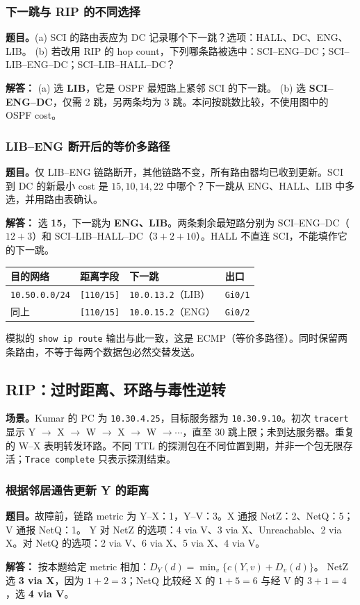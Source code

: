 \documentclass[11pt,a4paper,fontset=fandol]{ctexart}
\renewcommand{\exercisequestion}[2]{%
  \Needspace{5\baselineskip}%
  \subsubsection{#2}\label{exercise:#1}%
}
\renewenvironment{checkedsolution}
  {\par\nopagebreak[4]\textbf{解答：}\ignorespaces}
  {\par}
\begin{document}
\exercisequestion{SC2008-HW03-Q07}{下一跳与 RIP 的不同选择}
\textbf{题目。}(a) SCI 的路由表应为 DC 记录哪个下一跳？选项：HALL、DC、ENG、LIB。
(b) 若改用 RIP 的 hop count，下列哪条路被选中：SCI--ENG--DC；SCI--LIB--ENG--DC；SCI--LIB--HALL--DC？
\begin{checkedsolution}
(a) 选 \textbf{LIB}，它是 OSPF 最短路上紧邻 SCI 的下一跳。
(b) 选 \textbf{SCI--ENG--DC}，仅需 2 跳，另两条均为 3 跳。本问按跳数比较，不使用图中的 OSPF cost。
\end{checkedsolution}

\exercisequestion{SC2008-HW03-Q08}{LIB--ENG 断开后的等价多路径}
\textbf{题目。}仅 LIB--ENG 链路断开，其他链路不变，所有路由器均已收到更新。SCI 到 DC 的新最小 cost 是 $15,10,14,22$ 中哪个？下一跳从 ENG、HALL、LIB 中多选，并用路由表确认。
\begin{checkedsolution}
选 \textbf{15}，下一跳为 \textbf{ENG、LIB}。两条剩余最短路分别为 SCI--ENG--DC（$12+3$）和 SCI--LIB--HALL--DC（$3+2+10$）。HALL 不直连 SCI，不能填作它的下一跳。
\begin{center}
\small
\begin{tabular}{@{}llll@{}}
\toprule
目的网络 & 距离字段 & 下一跳 & 出口 \\
\midrule
\texttt{10.50.0.0/24} & \texttt{[110/15]} & \texttt{10.0.13.2}（LIB） & \texttt{Gi0/1} \\
同上 & \texttt{[110/15]} & \texttt{10.0.15.2}（ENG） & \texttt{Gi0/2} \\
\bottomrule
\end{tabular}
\end{center}
模拟的 \texttt{show ip route} 输出与此一致，这是 ECMP（等价多路径）。同时保留两条路由，不等于每两个数据包必然交替发送。
\end{checkedsolution}

\subsection{RIP：过时距离、环路与毒性逆转}

\textbf{场景。}Kumar 的 PC 为 \texttt{10.30.4.25}，目标服务器为 \texttt{10.30.9.10}。初次 \texttt{tracert} 显示 Y $\to$ X $\to$ W $\to$ X $\to$ W $\to\cdots$，直至 30 跳上限；未到达服务器。重复的 W--X 表明转发环路。不同 TTL 的探测包在不同位置到期，并非一个包无限存活；\texttt{Trace complete} 只表示探测结束。

\exercisequestion{SC2008-HW03-Q09}{根据邻居通告更新 Y 的距离}
\textbf{题目。}故障前，链路 metric 为 Y--X：1，Y--V：3。X 通报 NetZ：2、NetQ：5；V 通报 NetQ：1。
Y 对 NetZ 的选项：4 via V、3 via X、Unreachable、2 via X。对 NetQ 的选项：2 via V、6 via X、5 via X、4 via V。
\begin{checkedsolution}
按本题给定 metric 相加：$D_Y(d)=\min_v\{c(Y,v)+D_v(d)\}$。
NetZ 选 \textbf{3 via X}，因为 $1+2=3$；NetQ 比较经 X 的 $1+5=6$ 与经 V 的 $3+1=4$，选 \textbf{4 via V}。
\end{checkedsolution}
\end{document}
